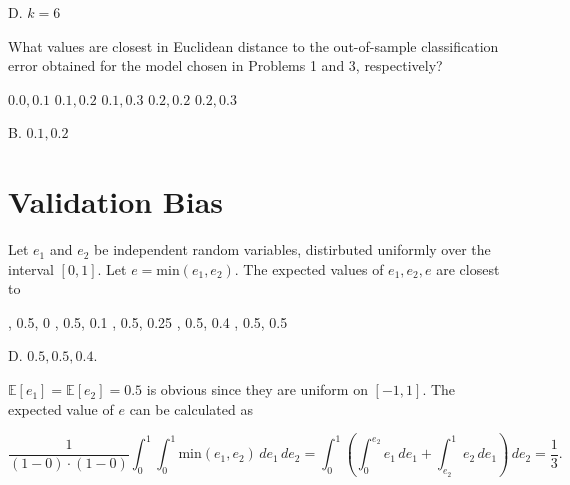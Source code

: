 \documentclass[answers]{exam}
\begin{document}
\begin{questions}
\begin{solution}
D. $k=6$
\end{solution}

\question What values are closest in Euclidean distance to the out-of-sample 
classification error obtained for the model chosen in Problems 1 and 3, 
respectively?

\begin{choices}
\choice $0.0, 0.1$
\choice $0.1, 0.2$
\choice $0.1, 0.3$
\choice $0.2, 0.2$
\choice $0.2, 0.3$
\end{choices}

\begin{solution}
B. $0.1, 0.2$
\end{solution}
\end{questions}

\section*{\textbf{Validation Bias}}

\begin{questions}
\setcounter{question}{5}
\question Let $e_1$ and $e_2$ be independent random variables, distirbuted 
uniformly over the interval $[0, 1]$. Let $e=\text{min}(e_1,e_2)$. The 
expected values of $e_1,e_2,e$ are closest to

\begin{choices}
, 0.5, 0 
, 0.5, 0.1
, 0.5, 0.25
, 0.5, 0.4
, 0.5, 0.5
\end{choices}

\begin{solution}
D. $0.5, 0.5, 0.4$.

$\mathbb{E}[e_1] = \mathbb{E}[e_2] = 0.5$ is obvious since they are uniform
on $[-1, 1]$. The expected value of $e$ can be calculated as

\[
    \frac{1}{(1 - 0) \cdot (1 - 0)}\int_{0}^{1} \int_{0}^{1} \text{min}(e_1,e_2) \, de_1 \, de_2 = \int_{0}^{1} \left( \int_{0}^{e_2} e_1 \, de_1 + \int_{e_2}^{1} e_2 \, de_1 \right) \, de_2 = \frac{1}{3}
.\] 
\end{solution}
\end{questions}
\end{document}
